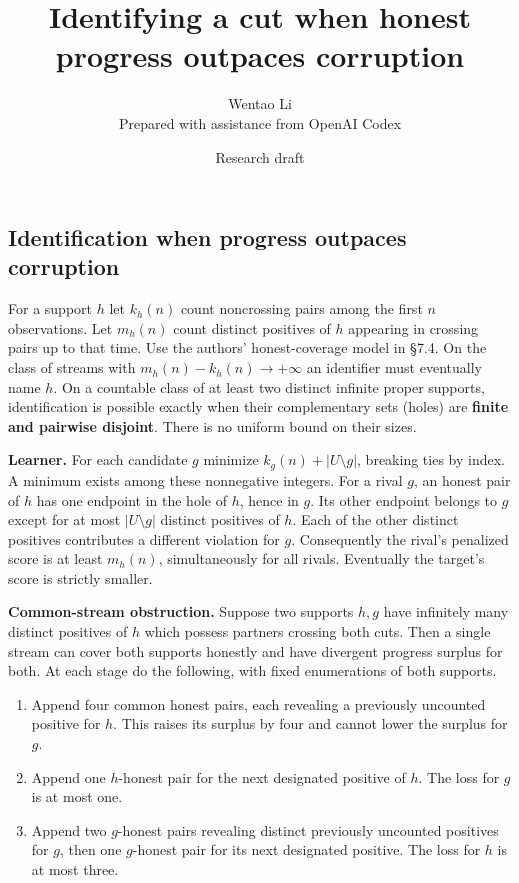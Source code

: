 \documentclass[11pt]{article}
\title{Identifying a cut when honest progress outpaces corruption}
\author{Wentao Li\\{\small Prepared with assistance from OpenAI Codex}}
\date{Research draft}
\providecommand{\tightlist}{\setlength{\itemsep}{0pt}\setlength{\parskip}{0pt}}
\begin{document}
\maketitle
\subsection{Identification when progress outpaces corruption}\label{identification-when-progress-outpaces-corruption}

For a support \(h\) let \(k_h(n)\) count noncrossing pairs among the first \(n\) observations. Let \(m_h(n)\) count distinct positives of \(h\) appearing in crossing pairs up to that time. Use the authors' honest-coverage model in §7.4. On the class of streams with \(m_h(n)-k_h(n)\to+\infty\) an identifier must eventually name \(h\). On a countable class of at least two distinct infinite proper supports, identification is possible exactly when their complementary sets (holes) are \textbf{finite and pairwise disjoint}. There is no uniform bound on their sizes.

\textbf{Learner.} For each candidate \(g\) minimize \(k_g(n)+|U\setminus g|\), breaking ties by index. A minimum exists among these nonnegative integers. For a rival \(g\), an honest pair of \(h\) has one endpoint in the hole of \(h\), hence in \(g\). Its other endpoint belongs to \(g\) except for at most \(|U\setminus g|\) distinct positives of \(h\). Each of the other distinct positives contributes a different violation for \(g\). Consequently the rival's penalized score is at least \(m_h(n)\), simultaneously for all rivals. Eventually the target's score is strictly smaller.

\textbf{Common-stream obstruction.} Suppose two supports \(h,g\) have infinitely many distinct positives of \(h\) which possess partners crossing both cuts. Then a single stream can cover both supports honestly and have divergent progress surplus for both. At each stage do the following, with fixed enumerations of both supports.

\begin{enumerate}
\def\labelenumi{\arabic{enumi}.}
\tightlist
\item
  Append four common honest pairs, each revealing a previously uncounted positive for \(h\). This raises its surplus by four and cannot lower the surplus for \(g\).
\item
  Append one \(h\)-honest pair for the next designated positive of \(h\). The loss for \(g\) is at most one.
\item
  Append two \(g\)-honest pairs revealing distinct previously uncounted positives for \(g\), then one \(g\)-honest pair for its next designated positive. The loss for \(h\) is at most three.
\end{enumerate}
\end{document}
